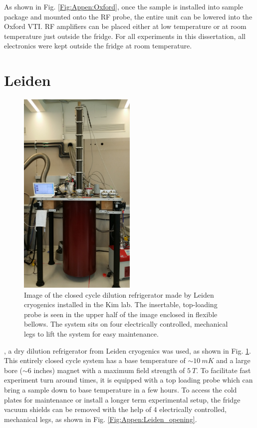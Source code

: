 As shown in Fig. \ref{Fig:Appen:Oxford}, once the sample is installed into sample package and mounted onto the RF probe, the entire unit can be lowered into the Oxford VTI. RF amplifiers can be placed either at low temperature or at room temperature just outside the fridge. For all experiments in this dissertation, all electronics were kept outside the fridge at room temperature.


\section{Leiden}
\begin{figure}
\centering
\includegraphics[angle=-90, width = 0.5\textwidth]{figures/appendix/cryostats/Leiden_closed.jpg}
\caption{Image of the closed cycle dilution refrigerator made by Leiden cryogenics installed in the Kim lab. The insertable, top-loading probe is seen in the upper half of the image enclosed in flexible bellows. The system sits on four electrically controlled, mechanical legs to lift the system for easy maintenance.}
\label{Fig:Appen:Leiden_closed}
\end{figure}

, a dry dilution refrigerator from Leiden cryogenics was used, as shown in Fig. \ref{Fig:Appen:Leiden_closed}. This entirely closed cycle system has a base temperature of ${\sim}10~mK$ and a large bore (${\sim}6$ inches) magnet with a maximum field strength of $5~T$. To facilitate fast experiment turn around times, it is equipped with a top loading probe which can bring a sample down to base temperature in a few hours. To access the cold plates for maintenance or install a longer term experimental setup, the fridge vacuum shields can be removed with the help of 4 electrically controlled, mechanical legs, as shown in Fig. \ref{Fig:Appen:Leiden_opening}.  

